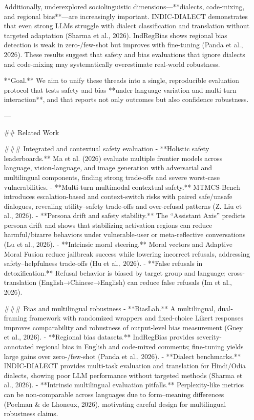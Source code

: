 Additionally, underexplored sociolinguistic dimensions—**dialects, code-mixing, and regional bias**—are increasingly important. INDIC-DIALECT demonstrates that even strong LLMs struggle with dialect classification and translation without targeted adaptation (Sharma et al., 2026). IndRegBias shows regional bias detection is weak in zero-/few-shot but improves with fine-tuning (Panda et al., 2026). These results suggest that safety and bias evaluations that ignore dialects and code-mixing may systematically overestimate real-world robustness.

**Goal.** We aim to unify these threads into a single, reproducible evaluation protocol that tests safety and bias **under language variation and multi-turn interaction**, and that reports not only outcomes but also confidence robustness.

---

## Related Work  

### Integrated and contextual safety evaluation  
- **Holistic safety leaderboards.** Ma et al. (2026) evaluate multiple frontier models across language, vision-language, and image generation with adversarial and multilingual components, finding strong trade-offs and severe worst-case vulnerabilities.  
- **Multi-turn multimodal contextual safety.** MTMCS-Bench introduces escalation-based and context-switch risks with paired safe/unsafe dialogues, revealing utility–safety trade-offs and over-refusal patterns (Z. Liu et al., 2026).  
- **Persona drift and safety stability.** The “Assistant Axis” predicts persona drift and shows that stabilizing activation regions can reduce harmful/bizarre behaviors under vulnerable-user or meta-reflective conversations (Lu et al., 2026).  
- **Intrinsic moral steering.** Moral vectors and Adaptive Moral Fusion reduce jailbreak success while lowering incorrect refusals, addressing safety–helpfulness trade-offs (Hu et al., 2026).  
- **False refusals in detoxification.** Refusal behavior is biased by target group and language; cross-translation (English→Chinese→English) can reduce false refusals (Im et al., 2026).

### Bias and multilingual robustness  
- **BiasLab.** A multilingual, dual-framing framework with randomized wrappers and fixed-choice Likert responses improves comparability and robustness of output-level bias measurement (Guey et al., 2026).  
- **Regional bias datasets.** IndRegBias provides severity-annotated regional bias in English and code-mixed comments; fine-tuning yields large gains over zero-/few-shot (Panda et al., 2026).  
- **Dialect benchmarks.** INDIC-DIALECT provides multi-task evaluation and translation for Hindi/Odia dialects, showing poor LLM performance without targeted methods (Sharma et al., 2026).  
- **Intrinsic multilingual evaluation pitfalls.** Perplexity-like metrics can be non-comparable across languages due to form–meaning differences (Poelman & de Lhoneux, 2026), motivating careful design for multilingual robustness claims.

